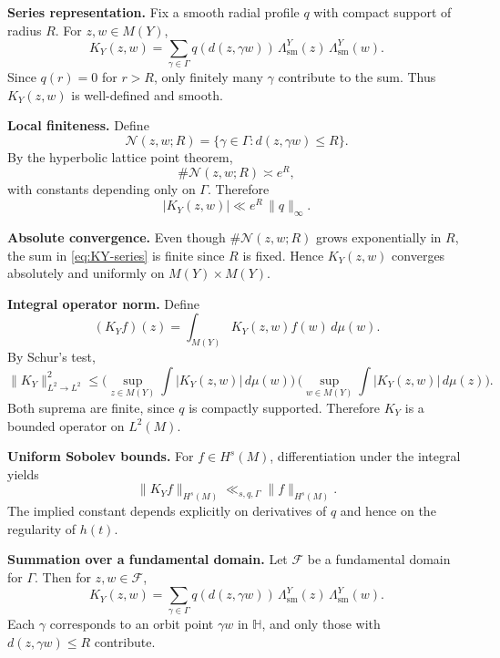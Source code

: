 \medskip

\noindent\textbf{Series representation.}
Fix a smooth radial profile $q$ with compact support of radius $R$.
For $z,w\in M(Y)$,
\begin{equation}\label{eq:KY-series}
  K_{Y}(z,w) = \sum_{\gamma\in\Gamma} q\!\left(d(z,\gamma w)\right)\,
  \Lambda^{Y}_{\mathrm{sm}}(z)\,\Lambda^{Y}_{\mathrm{sm}}(w).
\end{equation}
Since $q(r)=0$ for $r>R$, only finitely many $\gamma$ contribute to the sum.
Thus $K_{Y}(z,w)$ is well-defined and smooth.

\medskip

\noindent\textbf{Local finiteness.}
Define
\[
  \mathcal{N}(z,w;R) = \{\gamma\in\Gamma : d(z,\gamma w)\le R\}.
\]
By the hyperbolic lattice point theorem,
\[
  \#\mathcal{N}(z,w;R) \asymp e^{R},
\]
with constants depending only on $\Gamma$.
Therefore
\[
  |K_{Y}(z,w)| \ll e^{R}\,\|q\|_{\infty}.
\]

\medskip

\noindent\textbf{Absolute convergence.}
Even though $\#\mathcal{N}(z,w;R)$ grows exponentially in $R$,
the sum in \eqref{eq:KY-series} is finite since $R$ is fixed.
Hence $K_{Y}(z,w)$ converges absolutely and uniformly on $M(Y)\times M(Y)$.

\medskip

\noindent\textbf{Integral operator norm.}
Define
\[
  (K_{Y}f)(z) = \int_{M(Y)} K_{Y}(z,w) f(w)\,d\mu(w).
\]
By Schur’s test,
\[
  \|K_{Y}\|_{L^{2}\to L^{2}}^{2}
  \le \Big(\sup_{z\in M(Y)}\int |K_{Y}(z,w)|\,d\mu(w)\Big)\,
       \Big(\sup_{w\in M(Y)}\int |K_{Y}(z,w)|\,d\mu(z)\Big).
\]
Both suprema are finite, since $q$ is compactly supported.
Therefore $K_{Y}$ is a bounded operator on $L^{2}(M)$.

\medskip

\noindent\textbf{Uniform Sobolev bounds.}
For $f\in H^{s}(M)$,
differentiation under the integral yields
\[
  \|K_{Y}f\|_{H^{s}(M)} \ll_{s,q,\Gamma} \|f\|_{H^{s}(M)}.
\]
The implied constant depends explicitly on derivatives of $q$
and hence on the regularity of $h(t)$.

\medskip

\noindent\textbf{Summation over a fundamental domain.}
Let $\mathcal{F}$ be a fundamental domain for $\Gamma$.
Then for $z,w\in\mathcal{F}$,
\[
  K_{Y}(z,w) = \sum_{\gamma\in\Gamma} q(d(z,\gamma w))\,
  \Lambda^{Y}_{\mathrm{sm}}(z)\,\Lambda^{Y}_{\mathrm{sm}}(w).
\]
Each $\gamma$ corresponds to an orbit point $\gamma w$ in $\mathbb{H}$,
and only those with $d(z,\gamma w)\le R$ contribute.

